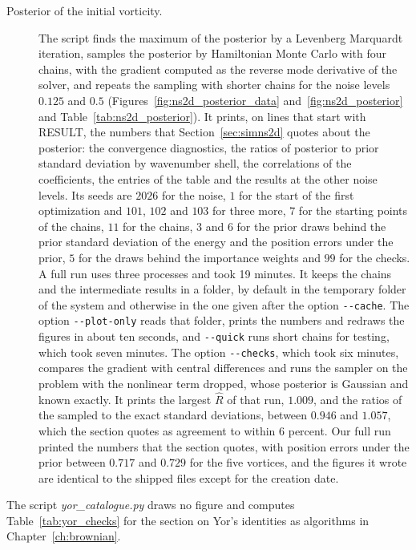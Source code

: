 \begin{description}
\item[Posterior of the initial vorticity.] The script finds the maximum of the posterior by a Levenberg Marquardt iteration, samples the posterior by Hamiltonian Monte Carlo with four chains, with the gradient computed as the reverse mode derivative of the solver, and repeats the sampling with shorter chains for the noise levels $0.125$ and $0.5$ (Figures~\ref{fig:ns2d_posterior_data} and~\ref{fig:ns2d_posterior} and Table~\ref{tab:ns2d_posterior}). It prints, on lines that start with RESULT, the numbers that Section~\ref{sec:simns2d} quotes about the posterior: the convergence diagnostics, the ratios of posterior to prior standard deviation by wavenumber shell, the correlations of the coefficients, the entries of the table and the results at the other noise levels. Its seeds are $2026$ for the noise, $1$ for the start of the first optimization and $101$, $102$ and $103$ for three more, $7$ for the starting points of the chains, $11$ for the chains, $3$ and $6$ for the prior draws behind the prior standard deviation of the energy and the position errors under the prior, $5$ for the draws behind the importance weights and $99$ for the checks. A full run uses three processes and took 19 minutes. It keeps the chains and the intermediate results in a folder, by default in the temporary folder of the system and otherwise in the one given after the option \texttt{-{}-cache}. The option \texttt{-{}-plot-only} reads that folder, prints the numbers and redraws the figures in about ten seconds, and \texttt{-{}-quick} runs short chains for testing, which took seven minutes. The option \texttt{-{}-checks}, which took six minutes, compares the gradient with central differences and runs the sampler on the problem with the nonlinear term dropped, whose posterior is Gaussian and known exactly. It prints the largest $\widehat R$ of that run, $1.009$, and the ratios of the sampled to the exact standard deviations, between $0.946$ and $1.057$, which the section quotes as agreement to within $6$ percent. Our full run printed the numbers that the section quotes, with position errors under the prior between $0.717$ and $0.729$ for the five vortices, and the figures it wrote are identical to the shipped files except for the creation date.
\end{description}

The script \textit{yor\_catalogue.py} draws no figure and computes Table~\ref{tab:yor_checks} for the section on Yor's identities as algorithms in Chapter~\ref{ch:brownian}.

